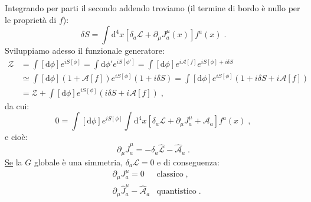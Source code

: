 \documentclass[12pt,a4paper]{article}
\theoremstyle{definition}
\newcommand{\lag}{\mathcal{L}}
\newcommand{\diff}[1][]{\mathrm{d}#1}
\newcommand{\zpart}{\mathcal{Z}}
\numberwithin{equation}{section}
\begin{document}
Integrando per parti il secondo addendo troviamo (il termine di bordo è nullo per le proprietà di $f$):
\begin{equation}
\boxed{
\delta S=\int\diff^4{x}\left[\delta_a\lag+\partial_{\mu}J^{\mu}_a(x)\right]f^a(x)
}\;.
\end{equation}
Sviluppiamo adesso il funzionale generatore:
\begin{align*}
\zpart &= \int[\diff{\phi}]e^{iS[\phi]}=\int\diff{\phi'}e^{iS[\phi']}=\int[\diff{\phi}]e^{i\mathcal{A}[f]}e^{iS[\phi]+i\delta S} \\
&\simeq \int[\diff{\phi}](1+\mathcal{A}[f])e^{iS[\phi]}(1+i\delta S)=\int[\diff{\phi}]e^{iS[\phi]}(1+i\delta S+i\mathcal{A}[f]) \\
&= \zpart+\int[\diff{\phi}]e^{iS[\phi]}(i\delta S+i\mathcal{A}[f])\;,
\end{align*}
da cui:
$$
0=\int[\diff{\phi }]e^{iS[\phi]}\int\diff^4{x}[\delta_a\lag+\partial_{\mu}J^{\mu}_a+\mathcal{A}_a]f^a(x)\;,
$$
e cioè:
\begin{equation}
\boxed{
\partial_{\mu}\hat{J}^{\mu}_a=-\delta_a\hat{\lag}-\hat{\mathcal{A}}_a
}\;.
\end{equation}
\underline{Se} la $G$ globale è una simmetria, $\delta_a\lag=0$ e di conseguenza:
\begin{align*}
&\partial_{\mu}J^{\mu}_a=0 &\mbox{classico}\;, \\
&\partial_{\mu}\hat{J}^{\mu}_a-\hat{\mathcal{A}}_a &\mbox{quantistico}\;.
\end{align*}
\end{document}
